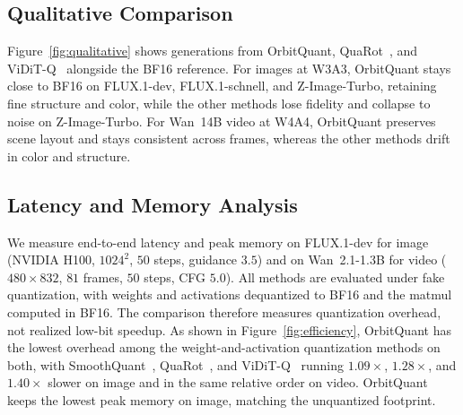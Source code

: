 

\subsection{Qualitative Comparison}
\label{sec:exp:qualitative}
Figure~\ref{fig:qualitative} shows generations from OrbitQuant, QuaRot~\cite{ashkboos2024quarot}, and ViDiT-Q~\cite{zhao2024vidit} alongside the BF16 reference. For images at W3A3, OrbitQuant stays close to BF16 on FLUX.1-dev, FLUX.1-schnell, and Z-Image-Turbo, retaining fine structure and color, while the other methods lose fidelity and collapse to noise on Z-Image-Turbo. For Wan~14B video at W4A4, OrbitQuant preserves scene layout and stays consistent across frames, whereas the other methods drift in color and structure.


\subsection{Latency and Memory Analysis}
We measure end-to-end latency and peak memory on FLUX.1-dev for image (NVIDIA H100, $1024^2$, $50$ steps, guidance $3.5$) and on Wan~2.1-1.3B for video ($480{\times}832$, $81$ frames, $50$ steps, CFG $5.0$). All methods are evaluated under fake quantization, with weights and activations dequantized to BF16 and the matmul computed in BF16. The comparison therefore measures quantization overhead, not realized low-bit speedup. As shown in Figure~\ref{fig:efficiency}, OrbitQuant has the lowest overhead among the weight-and-activation quantization methods on both, with SmoothQuant~\cite{xiao2023smoothquant}, QuaRot~\cite{ashkboos2024quarot}, and ViDiT-Q~\cite{zhao2024vidit} running $1.09\times$, $1.28\times$, and $1.40\times$ slower on image and in the same relative order on video. OrbitQuant keeps the lowest peak memory on image, matching the unquantized footprint.

